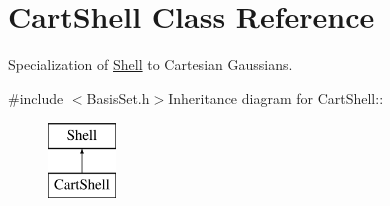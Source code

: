 \hypertarget{classJKBuilder_1_1CartShell}{
\section{CartShell Class Reference}
\label{classJKBuilder_1_1CartShell}
}


Specialization of \hyperlink{classJKBuilder_1_1Shell}{Shell} to Cartesian Gaussians.  


{\ttfamily \#include $<$BasisSet.h$>$}Inheritance diagram for CartShell::\begin{figure}[H]
\begin{center}
\leavevmode
\includegraphics[height=2cm]{classJKBuilder_1_1CartShell}
\end{center}
\end{figure}
